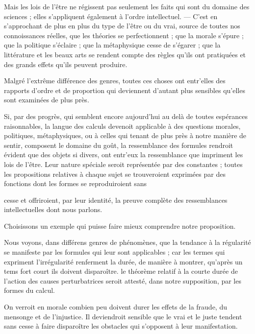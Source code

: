 \documentclass[11pt,a4paper]{article}
\begin{document}
Mais les lois de l'être ne régissent pas seulement les faits qui sont du
domaine des sciences ; elles s'appliquent également à l'ordre intellectuel.
--- C'est en s'approchant de plus en plus du type de l'être ou du vrai,
source de toutes nos connoissances réelles, que les théories se
perfectionnent ; que la morale s'épure ; que la politique s'éclaire ; que la
métaphysique cesse de s'égarer ; que la littérature et les beaux arts se
rendent compte des règles qu'ils ont pratiquées et des grands effets qu'ils
peuvent produire.

Malgré l'extrême différence des genres, toutes ces choses ont entr'elles
des rapports d'ordre et de proportion qui deviennent d'autant plus sensibles
qu'elles sont examinées de plus près.

Si, par des progrès, qui semblent encore aujourd'hui au delà de toutes
espérances raisonnables, la langue des calculs devenoit applicable à des
questions morales, politiques, métaphysiques, ou à celles qui tenant de plus
près à notre manière de sentir,   composent le
domaine du goût, la ressemblance des formules rendroit évident que des
objets si divers, ont entr'eux la ressemblance que  impriment
les lois de l'être. Leur nature spéciale seroit représentée par des
constantes ;  toutes  les propositions
relatives à chaque sujet se trouveroient exprimées par des fonctions dont
les formes se reproduiroient sans

cesse et offriroient, par leur identité, la preuve complète des
ressemblances intellectuelles dont nous parlons.

 Choisissons un exemple qui puisse faire mieux comprendre notre
proposition.

Nous voyons, dans différens genres de phénomènes, que la tendance à la
régularité se manifeste  par les formules qui leur sont
applicables ; car les termes qui  expriment
l'irrégularité  renferment la  durée, de manière
à montrer, qu'après un tems fort court ils doivent disparoître.
 le théorème relatif à la courte durée de l'action des
causes perturbatrices seroit attesté, dans notre supposition, par les formes
du calcul.

On verroit en morale combien peu doivent durer les effets de la fraude, du
mensonge et de l'injustice. Il deviendroit sensible que le vrai et le juste
tendent sans cesse à faire disparoître les obstacles qui s'opposent à leur
manifestation.
\end{document}
